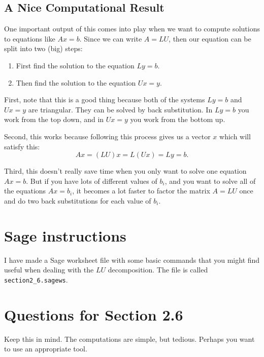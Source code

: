 \documentclass[11pt]{amsart}
\theoremstyle{definition}
\begin{document}
\subsection{A Nice Computational Result}

One important output of this comes into play when we want to compute solutions to equations like $Ax = b$. Since we can write $A = LU$, then our equation can be split into two (big) steps:
\begin{enumerate}
\item First find the solution to the equation $Ly = b$.

\item Then find the solution to the equation $Ux = y$.
\end{enumerate}

First, note that this is a good thing because both of the systems $Ly = b$ and $Ux = y$ are triangular. They can be solved by back substitution. In $Ly = b$ you work from the top down, and in $Ux=y$ you work from the bottom up.

Second, this works because following this process gives us a vector $x$ which will satisfy this:
\[
Ax = (LU)x = L (Ux) = Ly = b.
\]

Third, this doesn't really save time when you only want to solve one equation $Ax= b$. But if you have lots of different values of $b_i$, and you want to solve all of the equations $Ax = b_i$, it becomes a lot faster to factor the matrix $A= LU$ once and do two back substitutions for each value of $b_i$.



\section{Sage instructions}

I have made a Sage worksheet file with some basic commands that you might find useful when dealing with the $LU$ decomposition. The file is called \texttt{section2\_6.sagews}.


\section{Questions for Section 2.6}
\setcounter{exercise}{64}

Keep this in mind. The computations are simple, but tedious. Perhaps you want to use an appropriate tool.
\end{document}
